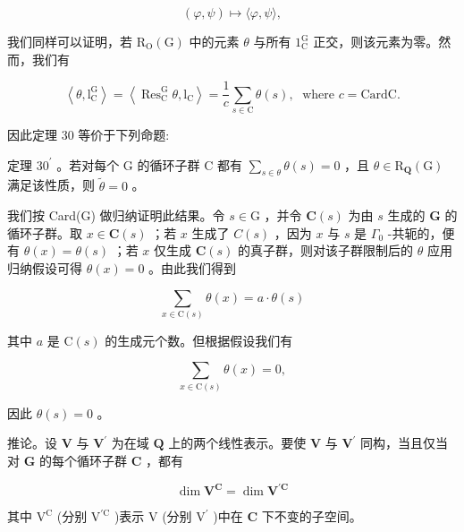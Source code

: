 \documentclass[10pt]{article}
\begin{document}
\[
\left( {\varphi ,\psi }\right)  \mapsto  \langle \varphi ,\psi \rangle ,
\]

我们同样可以证明，若 \({\mathrm{R}}_{\mathrm{O}}\left( \mathrm{G}\right)\) 中的元素 \(\theta\) 与所有 \({1}_{\mathrm{C}}^{\mathrm{G}}\) 正交，则该元素为零。然而，我们有

\[
\left\langle  {\theta ,{\mathrm{l}}_{\mathrm{C}}^{\mathrm{G}}}\right\rangle   = \left\langle  {{\operatorname{Res}}_{\mathrm{C}}^{\mathrm{G}}\theta ,{\mathrm{l}}_{\mathrm{C}}}\right\rangle   = \frac{1}{c}\mathop{\sum }\limits_{{s \in  \mathrm{C}}}\theta \left( s\right) ,\;\text{ where }c = \mathrm{{Card}}\mathrm{C}.
\]

因此定理 30 等价于下列命题:

定理 \({30}^{\prime }\) 。若对每个 \(\mathrm{G}\) 的循环子群 \(\mathrm{C}\) 都有 \(\mathop{\sum }\limits_{{s \in  \theta }}\theta \left( s\right)  = 0\) ，且 \(\theta  \in  {\mathrm{R}}_{\mathbf{Q}}\left( \mathrm{G}\right)\) 满足该性质，则 \(\widetilde{\theta } = 0\) 。

我们按 Card(G) 做归纳证明此结果。令 \(s \in  \mathrm{G}\) ，并令 \(\mathbf{C}\left( s\right)\) 为由 \(s\) 生成的 \(\mathbf{G}\) 的循环子群。取 \(x \in  \mathbf{C}\left( s\right)\) ；若 \(x\) 生成了 \(C\left( s\right)\) ，因为 \(x\) 与 \(s\) 是 \({\Gamma }_{0}\) -共轭的，便有 \(\theta \left( x\right)  = \theta \left( s\right)\) ；若 \(x\) 仅生成 \(\mathbf{C}\left( s\right)\) 的真子群，则对该子群限制后的 \(\theta\) 应用归纳假设可得 \(\theta \left( x\right)  = 0\) 。由此我们得到

\[
\mathop{\sum }\limits_{{x \in  \mathrm{C}\left( s\right) }}\theta \left( x\right)  = a \cdot  \theta \left( s\right)
\]

其中 \(a\) 是 \(\mathrm{C}\left( s\right)\) 的生成元个数。但根据假设我们有

\[
\mathop{\sum }\limits_{{x \in  \mathrm{C}\left( s\right) }}\theta \left( x\right)  = 0,
\]

因此 \(\theta \left( s\right)  = 0\) 。

推论。设 \(\mathbf{V}\) 与 \({\mathbf{V}}^{\prime }\) 为在域 \(\mathbf{Q}\) 上的两个线性表示。要使 \(\mathbf{V}\) 与 \({\mathbf{V}}^{\prime }\) 同构，当且仅当对 \(\mathbf{G}\) 的每个循环子群 \(\mathbf{C}\) ，都有

\[
\dim {\mathbf{V}}^{\mathbf{C}} = \dim {\mathbf{V}}^{\prime \mathbf{C}}
\]

其中 \({\mathrm{V}}^{\mathrm{C}}\) (分别 \({\mathrm{V}}^{\prime \mathrm{C}}\) )表示 \(\mathrm{V}\) (分别 \({\mathrm{V}}^{\prime }\) )中在 \(\mathbf{C}\) 下不变的子空间。
\end{document}
